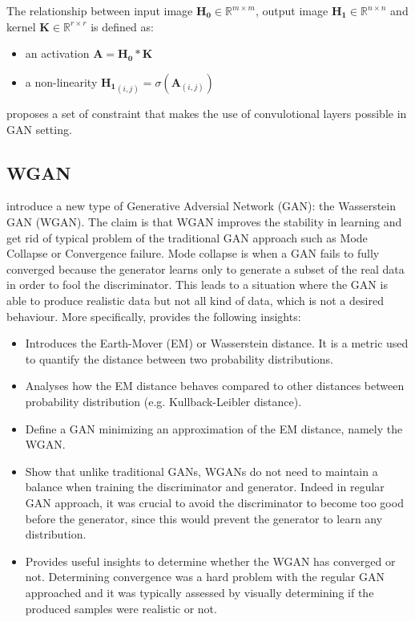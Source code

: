 \documentclass{article}
\begin{document}
The relationship between input image $\mathbf{H_0} \in \mathbb{R}^{m \times m}$, output image $\mathbf{H_1} \in \mathbb{R}^{n \times n}$ and kernel $\mathbf{K} \in \mathbb{R}^{r \times r}$ is defined as:


\begin{itemize} 
    \item an activation $\mathbf{A} = \mathbf{H_0} \ast \mathbf{K}$
    \item a non-linearity $\mathbf{H_1}_{(i,j)} = \sigma(\mathbf{A}_{(i,j)})$ 
\end{itemize}

\cite{radford2015unsupervised} proposes a set of constraint that makes the use of convulotional layers possible in GAN setting.


\subsection{WGAN}

\cite{arjovsky2017wasserstein} introduce a new type of Generative Adversial Network (GAN): the Wasserstein GAN (WGAN). The claim is that WGAN improves the stability in learning and get rid of typical problem of the traditional GAN approach such as Mode Collapse or Convergence failure. Mode collapse is when a GAN fails to fully converged because the generator learns only to generate a subset of the real data in order to fool the discriminator. This leads to a situation where the GAN is able to produce realistic data but not all kind of data, which is not a desired behaviour. More specifically, \cite{arjovsky2017wasserstein} provides the following insights:

\begin{itemize}
    \item Introduces the Earth-Mover (EM) or Wasserstein distance. It is a metric used to quantify the distance between two probability distributions.
    \item Analyses how the EM distance behaves compared to other distances between probability distribution (e.g. Kullback-Leibler distance).
    \item Define a GAN minimizing an approximation of the EM distance, namely the WGAN.
    \item Show that unlike traditional GANs, WGANs do not need to maintain a balance when training the discriminator and generator. Indeed in regular GAN approach, it was crucial to avoid the discriminator to become too good before the generator, since this would prevent the generator to learn any distribution.
    \item Provides useful insights to determine whether the WGAN has converged or not. Determining convergence was a hard problem with the regular GAN approached and it was typically assessed by visually determining if the produced samples were realistic or not.
\end{itemize}
\end{document}
